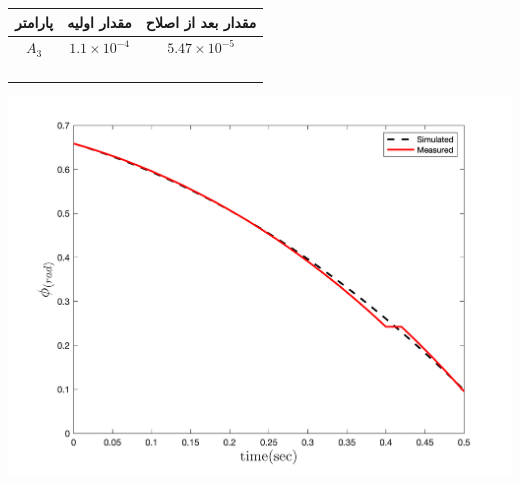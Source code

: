  \begin{minipage}[H]{\linewidth}
	\hfill
	\begin{minipage}[b]{0.49\linewidth}
		\centering
		\begin{tabular}{ccc}\hline
			پارامتر & مقدار اولیه  & مقدار بعد از اصلاح
			\\ \hline
			$A_3$  & $1.1\times10^{-4}$ & $5.47\times10^{-5}$ \\ \hline
			\\
			\\\\\\
		\end{tabular}
	\captionsetup{justification=centering}
	\end{minipage}
	\begin{minipage}[b]{0.48\linewidth}
		\centering
		\includegraphics[width=1\linewidth]{../Figures/RCP/roll_parameter_estimation/RCP_roll_S4.png}
		\captionsetup{justification=centering}
	\end{minipage}
\end{minipage}